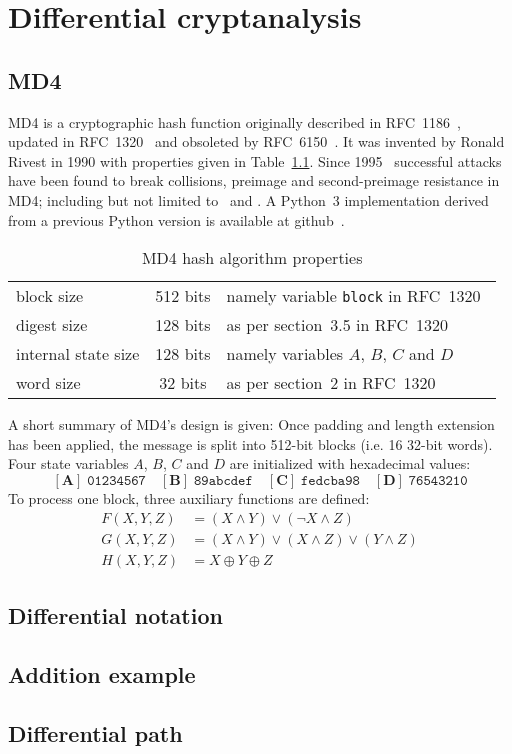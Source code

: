 \chapter{Differential cryptanalysis}
\label{ch:diff-crypt}
%

\section{MD4}
\label{ch:md4}
%
MD4 is a cryptographic hash function originally described in RFC~1186~\cite{rfc1186},
updated in RFC~1320~\cite{rfc1320} and obsoleted by RFC~6150~\cite{rfc6150}. It was
invented by Ronald Rivest in 1990 with properties given in Table~\ref{tab:md4}.
Since 1995~\cite{Dobbertin1998} successful attacks have been found to break collisions,
preimage and second-preimage resistance in MD4; including but not limited to~\cite{md4-2007} and
\cite{cryptoeprint:2005:151}. A Python~3 implementation derived from a previous Python version
is available at github~\cite{md4-py3k}.

\begin{table}[h]
  \begin{center}
    \begin{tabular}{lcl}
      block size           & 512 bits       & namely variable \texttt{block} in RFC~1320~\cite{rfc1320} \\
      digest size          & 128 bits       & as per section~3.5 in RFC~1320~\cite{rfc1320} \\
      internal state size  & 128 bits       & namely variables $A$, $B$, $C$ and $D$ \\
      word size            & 32 bits        & as per section~2 in RFC~1320~\cite{rfc1320} \\
    \end{tabular}
    \caption{MD4 hash algorithm properties}
    \label{tab:md4}
  \end{center}
\end{table}

A short summary of MD4's design is given:
Once padding and length extension has been applied, the message is split into 512-bit blocks
(i.e. 16 32-bit words). Four state variables $A$, $B$, $C$ and $D$ are initialized
with hexadecimal values:
\[
  \mathbf{[A]}\; \mathtt{01234567} \quad
  \mathbf{[B]}\; \mathtt{89abcdef} \quad
  \mathbf{[C]}\; \mathtt{fedcba98} \quad
  \mathbf{[D]}\; \mathtt{76543210}
\]
To process one block, three auxiliary functions are defined:
\begin{align}
  F(X,Y,Z) &= (X \land Y) \lor (\neg X \land Z) \\
  G(X,Y,Z) &= (X \land Y) \lor (X \land Z) \lor (Y \land Z) \\
  H(X,Y,Z) &= X \oplus Y \oplus Z
\end{align}

\section{Differential notation}
\section{Addition example}
\section{Differential path}

